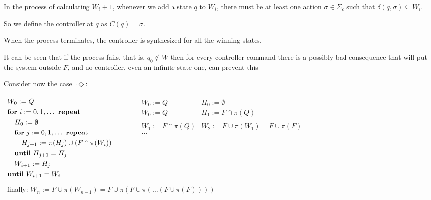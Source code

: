 \documentclass[table]{beamer}
\begin{document}
\begin{frame}
	\justify
	In the process of calculating $W_i+1$, whenever we add a state $q$ to $W_i$, 
	there must be at least one action $\sigma \in \Sigma_c$ such that $\delta(q,\sigma) \subseteq W_i$.
	
	\medskip	
	
	So we define the controller at $q$ as $C(q)=\sigma$.
	
	\medskip
	
	When the process terminates, the controller is synthesized for all the winning states.
		
	\medskip
	
	It can be seen that if the process fails, that is, $q_0 \not\in W$ then for every controller
	command there is a possibly bad consequence that will put the system outside $F$, 
	and no controller, even an infinite state one, can prevent this.
\end{frame}
\begin{frame}
	Consider now the case $\square\Diamond$:
	\begin{table}[]
		\begin{tabular}{lll}
		$\begin{aligned}
			&W_0 := Q \\
			&\textrm{\textbf{for} } i:=0,1,\ldots \textrm{ \textbf{repeat}} \\
			&\quad H_0 := \emptyset \\
			&\quad \textrm{\textbf{for} } j:=0,1,\ldots \textrm{ \textbf{repeat}} \\
			&\quad \quad H_{j+1} := \pi(H_j) \cup (F \cap \pi(W_i)) \\
			&\quad \textrm{\textbf{until} }H_{j+1} = H_j\\
			& \quad W_{i+1} := H_j \\
			&\textrm{\textbf{until} } W_{i+1} = W_i\\
		\end{aligned}$
		& $\quad$ &
		$\begin{aligned}
			&W_0 := Q & H_0 := \emptyset \\
			&W_0 := Q & H_1 := F \cap \pi(Q) \\
			& \\
			& W_1 := F \cap \pi(Q)
			&W_2 := F \cup \pi(W_1) = F \cup \pi(F)\\
			& \ldots \\
		\end{aligned}$ \\
		&&\\%
		\multicolumn{3}{l}{finally: $W_n := F \cup \pi(W_{n-1}) = F \cup \pi(F \cup \pi(\ldots(F \cup \pi(F))))$}
		\end{tabular}
	\end{table}
\end{frame}
\end{document}
